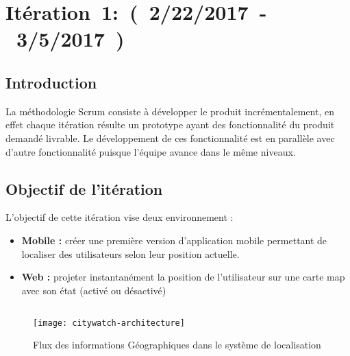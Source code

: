 \section{Itération~1:~(~2/22/2017~-~3/5/2017~)}
\subsection{Introduction}
La méthodologie Scrum consiste à développer le produit incrémentalement, en effet
chaque itération résulte un prototype ayant des fonctionnalité du produit demandé
livrable. Le développement de ces fonctionnalité  est en parallèle avec
d'autre fonctionnalité puisque l'équipe avance dans le même niveaux.

\subsection{Objectif de l'itération}

L'objectif de cette itération vise deux environnement :
\begin{itemize}
 \item \textbf{Mobile :} créer une première version d'application mobile permettant de localiser
des utilisateurs selon leur position actuelle.
\item \textbf{Web :} projeter instantanément la position de l'utilisateur sur une carte map avec son état
(activé ou désactivé)
\end{itemize}
\subsection*{}
\begin{figure}[htbp]
  \centering
  \texttt{[image: citywatch-architecture]}
  \caption[Flux des information Géographiques en CityWatch]
  {Flux des informations Géographiques dans le système de localisation}
  \label{fig:citywatch-architecture}
\end{figure}






